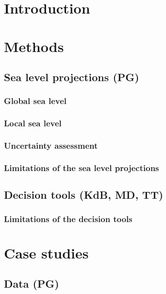 \documentclass[wrr, draft]{agutex}
\begin{document}
\begin{article}



\section{Introduction}\label{sec:intro}

\section{Methods}

\subsection{Sea level projections {\color{blue} (PG)}}

\subsubsection{Global sea level}

\subsubsection{Local sea level}

\subsubsection{Uncertainty assessment}


\subsubsection{Limitations of the sea level projections}

\subsection{Decision tools {\color{blue} (KdB, MD, TT)}}

\subsubsection{Limitations of the decision tools}

\section{Case studies}

\subsection{Data {\color{blue} (PG)}}


\end{article}
\end{document}
